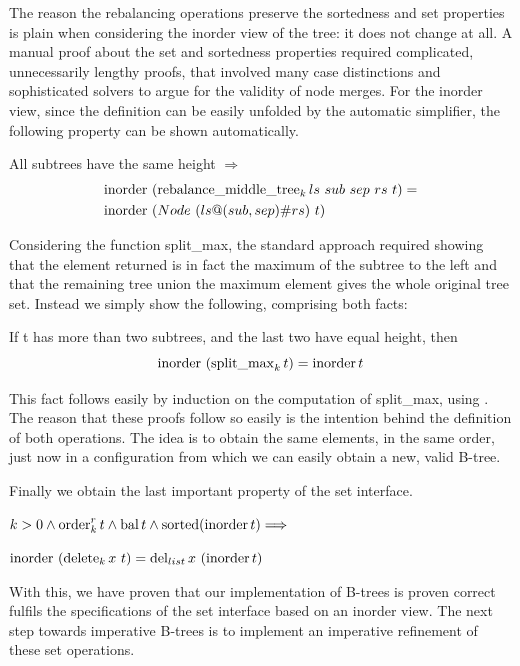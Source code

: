 The reason the rebalancing operations preserve the sortedness and set properties
is plain when considering the inorder view of the tree:
it does not change at all.
A manual proof about the set and sortedness properties
required complicated, unnecessarily lengthy proofs,
that involved many case distinctions and sophisticated solvers
to argue for the validity of node merges.
For the inorder view, 
since the definition can be easily unfolded
by the automatic simplifier,
the following property can be shown automatically.

\begin{lemma}
    \label{lem:rebalance-inorder}
    All subtrees have the same height $\Longrightarrow$ \\
    \begin{align*}
    \operatorname{inorder}&\ (\operatorname{rebalance\_middle\_tree}_k ls\ sub\ sep\ rs\ t) =\\
    \operatorname{inorder}&\ (Node\ (ls@(sub,sep)\#rs)\ t)
    \end{align*}
\end{lemma}

Considering the function split\_max,
the standard approach required showing
that the element returned is in fact the maximum
of the subtree to the left
and that the remaining tree union the maximum element
gives the whole original tree set.
Instead we simply show the following,
comprising both facts:

\begin{lemma}
    \label{lem:splitmax-inorder}
    If t has more than two subtrees, and the last two have equal height, then
    \begin{equation*}
    \operatorname{inorder}\ (\operatorname{split\_max}_k t) = \operatorname{inorder} t
    \end{equation*}
\end{lemma}

This fact follows easily by induction on the computation of split\_max,
using .
The reason that these proofs follow so easily
is the intention behind the definition of both operations.
The idea is to obtain the same elements, in the same order,
just now in a configuration from which we can easily obtain
a new, valid B-tree.

Finally we obtain the last important property of the set interface.
\begin{theorem}
    $k > 0 \wedge \operatorname{order}^r_k t \wedge \operatorname{bal} t \wedge \operatorname{sorted}  (\operatorname{inorder} t)\Longrightarrow$\\
    \begin{center}
    $\operatorname{inorder}\ (\operatorname{delete}_k x\ t) = \operatorname{del}_{list} x\ (\operatorname{inorder} t)$
    \end{center}
\end{theorem}

With this, we have proven that 
our implementation of B-trees is proven correct
fulfils the specifications of the set interface based on an inorder view.
The next step towards imperative B-trees is to implement
an imperative refinement of these set operations.

